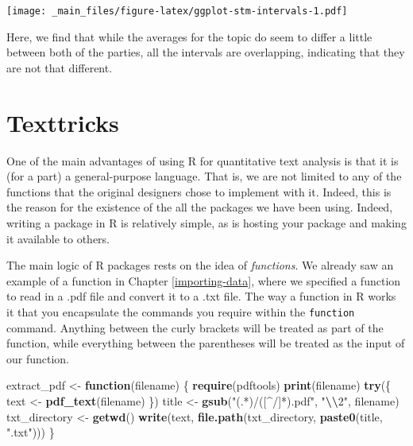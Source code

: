 \documentclass[
]{book}
\newenvironment{Shaded}{\begin{snugshade}}{\end{snugshade}}
\newcommand{\ControlFlowTok}[1]{\textcolor[rgb]{0.13,0.29,0.53}{\textbf{#1}}}
\newcommand{\FunctionTok}[1]{\textcolor[rgb]{0.13,0.29,0.53}{\textbf{#1}}}
\newcommand{\NormalTok}[1]{#1}
\newcommand{\OtherTok}[1]{\textcolor[rgb]{0.56,0.35,0.01}{#1}}
\newcommand{\SpecialCharTok}[1]{\textcolor[rgb]{0.81,0.36,0.00}{\textbf{#1}}}
\newcommand{\StringTok}[1]{\textcolor[rgb]{0.31,0.60,0.02}{#1}}
\begin{document}
\texttt{[image: \_main\_files/figure-latex/ggplot-stm-intervals-1.pdf]}

Here, we find that while the averages for the topic do seem to differ a little between both of the parties, all the intervals are overlapping, indicating that they are not that different.

\chapter{Texttricks}\label{texttricks}

One of the main advantages of using R for quantitative text analysis is that it is (for a part) a general-purpose language. That is, we are not limited to any of the functions that the original designers chose to implement with it. Indeed, this is the reason for the existence of the all the packages we have been using. Indeed, writing a package in R is relatively simple, as is hosting your package and making it available to others.

The main logic of R packages rests on the idea of \emph{functions}. We already saw an example of a function in Chapter \ref{importing-data}, where we specified a function to read in a .pdf file and convert it to a .txt file. The way a function in R works it that you encapsulate the commands you require within the \texttt{function} command. Anything between the curly brackets will be treated as part of the function, while everything between the parentheses will be treated as the input of our function.

\begin{Shaded}
\begin{Highlighting}[]
\NormalTok{extract\_pdf }\OtherTok{\textless{}{-}} \ControlFlowTok{function}\NormalTok{(filename) \{}
  \FunctionTok{require}\NormalTok{(pdftools)}
  \FunctionTok{print}\NormalTok{(filename)}
  \FunctionTok{try}\NormalTok{(\{}
\NormalTok{    text }\OtherTok{\textless{}{-}} \FunctionTok{pdf\_text}\NormalTok{(filename)}
\NormalTok{  \})}
\NormalTok{  title }\OtherTok{\textless{}{-}} \FunctionTok{gsub}\NormalTok{(}\StringTok{"(.*)/([\^{}/]*).pdf"}\NormalTok{, }\StringTok{"}\SpecialCharTok{\textbackslash{}\textbackslash{}}\StringTok{2"}\NormalTok{, filename)}
\NormalTok{  txt\_directory }\OtherTok{\textless{}{-}} \FunctionTok{getwd}\NormalTok{()}
  \FunctionTok{write}\NormalTok{(text, }\FunctionTok{file.path}\NormalTok{(txt\_directory, }\FunctionTok{paste0}\NormalTok{(title, }\StringTok{".txt"}\NormalTok{)))}
\NormalTok{\}}
\end{Highlighting}
\end{Shaded}
\end{document}
